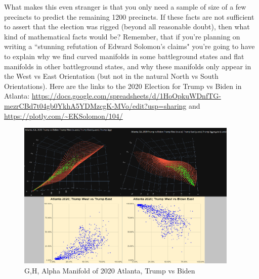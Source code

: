 \documentclass[preprint,13pt]{elsarticle}
\begin{document}
What makes this even stranger is that you only need a sample of size of a few precincts to predict the remaining 1200 precincts. If these facts are not sufficient to assert that the election was rigged (beyond all reasonable doubt), then what kind of mathematical facts would be? Remember, that if you're planning on writing a ``stunning refutation of Edward Solomon's claims" you're going to have to explain why we find curved manifolds in some battleground states and flat manifolds in other battleground states, and why these manifolds only appear in the West vs East Orientation (but not in the natural North vs South Orientations). Here are the links to the 2020 Election for Trump vs Biden in Atlanta: \url{https://docs.google.com/spreadsheets/d/1HoOpkuWDnfTG-mezrCBd7t04gb0YkhA5YDMzcgK-MVo/edit?usp=sharing} and \url{https://plotly.com/~EKSolomon/104/}
\begin{figure}[bp!]
\begin{center}
\caption{G,H, Alpha Manifold of 2020 Atlanta, Trump vs Biden}
\includegraphics[width=300pt]{atlanta latex.png}
\end{center}
\end{figure}
\newpage
\end{document}
